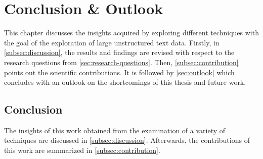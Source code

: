 \chapter{Conclusion \& Outlook}\label{ch:conclusion-outlook}
This chapter discusses the insights acquired by exploring different techniques with the goal of the exploration of large unstructured text data.
Firstly, in \autoref{subsec:discussion}, the results and findings are revised with respect to the research questions from \autoref{sec:research-questions}.
Then, \autoref{subsec:contribution} points out the scientific contributions. 
It is followed by \autoref{sec:outlook} which concludes with an outlook on the shortcomings of this thesis and future work.

\section{Conclusion}\label{sec:conclusion}

The insights of this work obtained from the examination of a variety of techniques are discussed in \autoref{subsec:discussion}.
Afterwards, the contributions of this work are summarized in \autoref{subsec:contribution}.








